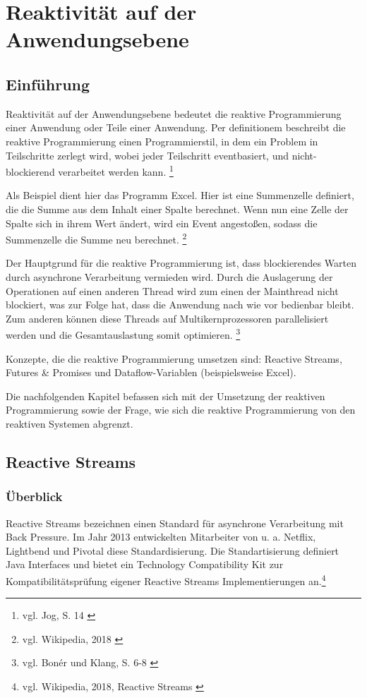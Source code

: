 \chapter{Reaktivität auf der Anwendungsebene}
\label{chap:reaktivitaet_auf_der_anwendungsebene}
\section{Einführung}
Reaktivität auf der Anwendungsebene bedeutet die reaktive Programmierung einer Anwendung oder Teile einer Anwendung.
Per definitionem beschreibt die reaktive Programmierung einen Programmierstil, in dem ein Problem in Teilschritte zerlegt wird, wobei jeder Teilschritt eventbasiert,  und nicht-blockierend verarbeitet werden kann. \footnote{vgl. Jog, S. 14 \cite{buch:reactive_programming_with_java9:kapitel1}}

Als Beispiel dient hier das Programm Excel. Hier ist eine Summenzelle definiert, die die Summe aus dem Inhalt einer Spalte berechnet. Wenn nun eine Zelle der Spalte sich in ihrem Wert ändert, wird ein Event angestoßen, sodass die Summenzelle die Summe neu berechnet. \footnote{vgl. Wikipedia, 2018 \cite{web:wiki:reactive_programming}}

Der Hauptgrund für die reaktive Programmierung ist, dass blockierendes Warten durch asynchrone Verarbeitung vermieden wird. Durch die Auslagerung der Operationen auf einen anderen Thread wird zum einen der Mainthread nicht blockiert, was zur Folge hat, dass die Anwendung nach wie vor bedienbar bleibt. Zum anderen können diese Threads auf Multikernprozessoren parallelisiert werden und die Gesamtauslastung somit optimieren. \footnote{vgl. Bonér und Klang, S. 6-8 \cite{technischer_bericht:lightbend:rpvsrs} \label{lightbend:rpvsrs}}

Konzepte, die die reaktive Programmierung umsetzen sind: Reactive Streams, Futures \& Promises und Dataflow-Variablen (beispielsweise Excel). 

Die nachfolgenden Kapitel befassen sich mit der Umsetzung der reaktiven Programmierung sowie der Frage, wie sich die reaktive Programmierung von den reaktiven Systemen abgrenzt.

\section{Reactive Streams}
\label{sec:reactive_streams}
\subsection{Überblick}
Reactive Streams bezeichnen einen Standard für asynchrone Verarbeitung mit Back Pressure. Im Jahr 2013 entwickelten Mitarbeiter von u. a. Netflix, Lightbend und Pivotal diese Standardisierung. Die Standartisierung definiert Java Interfaces und bietet ein Technology Compatibility Kit zur Kompatibilitätsprüfung eigener Reactive Streams Implementierungen an.\footnote{vgl. Wikipedia, 2018, Reactive Streams \cite{web:wiki:reactive_streams}}

